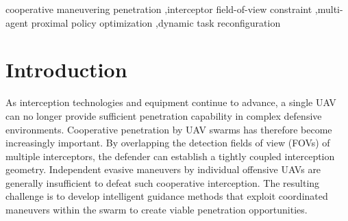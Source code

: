 \documentclass{cja}
\begin{document}
\begin{keyword}
cooperative maneuvering penetration \sep interceptor field-of-view constraint \sep multi-agent proximal policy optimization \sep dynamic task reconfiguration
\end{keyword}

\maketitle

\section{Introduction}
\label{sec:introduction}

As interception technologies and equipment continue to advance, a single UAV can no longer provide sufficient penetration capability in complex defensive environments. Cooperative penetration by UAV swarms has therefore become increasingly important.
By overlapping the detection fields of view (FOVs) of multiple interceptors, the defender can establish a tightly coupled interception geometry. Independent evasive maneuvers by individual offensive UAVs are generally insufficient to defeat such cooperative interception.
The resulting challenge is to develop intelligent guidance methods that exploit coordinated maneuvers within the swarm to create viable penetration opportunities.
\end{document}
